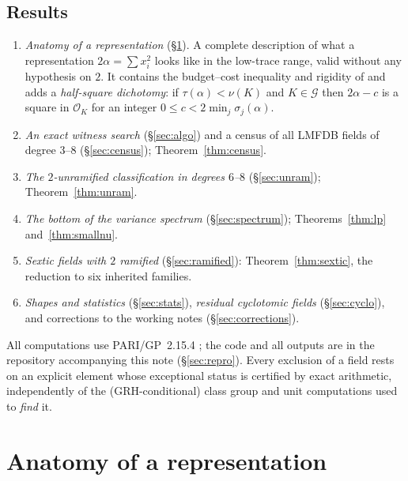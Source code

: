 \documentclass[11pt,reqno]{amsart}
\theoremstyle{plain}
\theoremstyle{definition}
\newcommand{\OK}{\mathcal{O}_K}
\newcommand{\Gcl}{\mathcal{G}}
\begin{document}
\subsection*{Results}
\begin{enumerate}
\item \emph{Anatomy of a representation} (\S\ref{sec:anatomy}). A complete description of what a
representation $2\alpha=\sum x_i^2$ looks like in the low-trace range, valid without any
hypothesis on $2$. It contains the budget--cost inequality and rigidity of \cite{PB} and adds a
\emph{half-square dichotomy}: if $\tau(\alpha)<\nu(K)$ and $K\in\Gcl$ then $2\alpha-c$ is a square
in $\OK$ for an integer $0\le c<2\min_j\sigma_j(\alpha)$.
\item \emph{An exact witness search} (\S\ref{sec:algo}) and a census of all LMFDB fields of degree
$3$--$8$ (\S\ref{sec:census}); Theorem~\ref{thm:census}.
\item \emph{The $2$-unramified classification in degrees $6$--$8$} (\S\ref{sec:unram});
Theorem~\ref{thm:unram}.
\item \emph{The bottom of the variance spectrum} (\S\ref{sec:spectrum}); Theorems~\ref{thm:lp}
and~\ref{thm:smallnu}.
\item \emph{Sextic fields with $2$ ramified} (\S\ref{sec:ramified}): Theorem~\ref{thm:sextic}, the
reduction to six inherited families.
\item \emph{Shapes and statistics} (\S\ref{sec:stats}), \emph{residual cyclotomic fields}
(\S\ref{sec:cyclo}), and corrections to the working notes (\S\ref{sec:corrections}).
\end{enumerate}

All computations use PARI/GP~2.15.4 \cite{PARI}; the code and all outputs are in the repository
accompanying this note (\S\ref{sec:repro}). Every exclusion of a field rests on an explicit element
whose exceptional status is certified by exact arithmetic, independently of the (GRH-conditional)
class group and unit computations used to \emph{find} it.

\section{Anatomy of a representation}\label{sec:anatomy}
\end{document}
